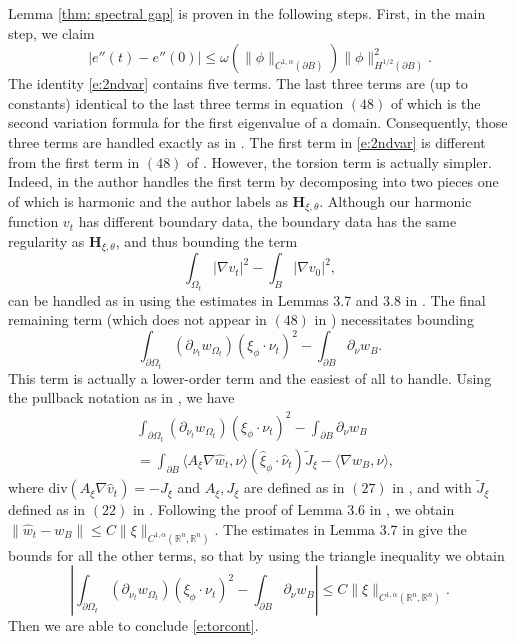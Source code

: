 \documentclass[10pt, reqno]{amsart}
\numberwithin{equation}{section}
\def\W{\Omega}
\begin{document}
Lemma \ref{thm: spectral gap} is proven in the following steps. First, in the main step, we claim 
\begin{equation} \label{e:torcont}
 |e''(t)-e''(0)|\leq \omega(\| \phi \|_{C^{1,\alpha}(\partial B)}) \| \phi \|^2_{H^{1/2}(\partial B)}. 
\end{equation}
 The identity \eqref{e:2ndvar} contains five terms. The last three terms are (up to constants) identical to the last three terms in equation $(48)$ of \cite{p24} which is the second variation formula for the first eigenvalue of a domain. Consequently, those three terms are handled exactly as in \cite{p24}. The first term in \eqref{e:2ndvar} is different from the first term in $(48)$ of \cite{p24}. However, the torsion term is actually simpler. Indeed, in \cite{p24} the author handles the first term by decomposing into two pieces one of which is harmonic and the author labels as $\textbf{H}_{\xi,\theta}$. Although our harmonic function $v_t$ has different boundary data, the boundary data has the same regularity as $\textbf{H}_{\xi,\theta}$, and thus bounding the term 
\[
\int_{\Omega_t} |\nabla v_t|^2 - \int_{B}|\nabla v_0|^2,
\]
can be handled as in \cite{p24} using the estimates in Lemmas 3.7 and 3.8 in \cite{p24}. 
The final remaining term (which does not appear in $(48)$ in \cite{p24}) necessitates bounding 
\[
\int_{\partial \W_t} (\partial_{\nu_t} w_{\W_t})(\xi_{\phi}\cdot \nu_t)^2 - \int_{\partial B} \partial_{\nu} w_{B}.
\]
This term is actually a lower-order term and the easiest of all to handle. Using the pullback notation as in \cite{p24}, we have 
\[
\begin{aligned}
&\int_{\partial \W_t} (\partial_{\nu_t} w_{\W_t})(\xi_{\phi}\cdot \nu_t)^2 - \int_{\partial B} \partial_{\nu} w_{B} \\
&=\int_{\partial B} \langle A_{\xi} \nabla \hat{w}_t,\nu \rangle (\hat{\xi}_{\phi} \cdot \hat{\nu}_t) \tilde{J}_{\xi}- \langle \nabla w_{B}, \nu \rangle,
\end{aligned}
\]
where $\text{div}(A_\xi \nabla \hat{v}_t)=-J_{\xi}$ and $A_\xi, J_{\xi}$ are defined as in $(27)$ in \cite{p24}, and with $\tilde{J}_{\xi}$ defined as in $(22)$ in \cite{p24}. Following the proof of Lemma 3.6 in \cite{p24}, we obtain $\|\hat{w}_t - w_{B}\|\leq C \| \xi \|_{C^{1,\alpha}(\mathbb{R}^n, \mathbb{R}^n)}$. The estimates in Lemma 3.7 in \cite{p24} give the bounds for all the other terms, so that by using the triangle inequality we obtain 
\[
\left|\int_{\partial \W_t} (\partial_{\nu_t} w_{\W_t})(\xi_{\phi}\cdot \nu_t)^2 - \int_{\partial B} \partial_{\nu} w_{B} \right| \leq C \| \xi \|_{C^{1,\alpha}(\mathbb{R}^n, \mathbb{R}^n)}. 
\]
Then we are able to conclude \eqref{e:torcont}. 
\end{document}

